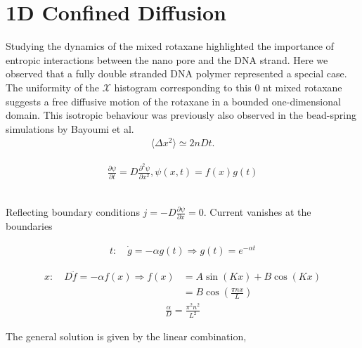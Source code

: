 \chapter{1D Confined Diffusion}

Studying the dynamics of the mixed rotaxane highlighted the importance of entropic
interactions between the nano pore and the DNA strand. Here we observed that a fully
double stranded DNA polymer represented a special case. The uniformity of the
$\mathcal{X}$ histogram corresponding to this 0 nt mixed rotaxane suggests a free
diffusive motion of the rotaxane in a bounded one-dimensional domain. This isotropic
behaviour was previously also observed in the bead-spring simulations by Bayoumi et
al. \cite{EntropicPiston}\\

\begin{align*}
  \langle \Delta x^2 \rangle \simeq 2n Dt.
\end{align*}


\begin{align*}
  \frac{\partial \psi}{\partial t} =  D \frac{\partial^2 \psi}{\partial x^2}, \psi(x,t) =
f(x)g(t)
\end{align*}

\begin{align*}
\end{align*}

Reflecting boundary conditions $j = - D \frac{\partial \psi}{\partial x} = 0$. Current
vanishes at the boundaries

\begin{align*}
t:\quad \dot{g} = - \alpha g(t) \Rightarrow g(t) = e^{-\alpha t}
\end{align*}

\begin{align*}
  x:\quad D \ddot{f} = - \alpha f(x) \Rightarrow f(x) &= A \sin(K x) + B \cos(Kx)\\
  &= B \cos(\frac{\pi n x}{L})
\end{align*}
\begin{align*}
  \frac{\alpha}{D} = \frac{\pi^2 n^2}{L^2}
\end{align*}

The general solution is given by the linear combination,

